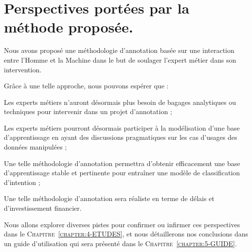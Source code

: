 \section{Perspectives portées par la méthode proposée.}
\label{section:3.3-PERSPECTIVES-METHODE}

	Nous avons proposé une méthodologie d'annotation basée sur une interaction entre l'Homme et la Machine dans le but de soulager l'expert métier dans son intervention.
	
	Grâce à une telle approche, nous pouvons espérer que :
	\begin{todolist}
		\item Les experts métiers n'auront désormais plus besoin de bagages analytiques ou techniques pour intervenir dans un projet d'annotation ;
		\item Les experts métiers pourront désormais participer à la modélisation d'une base d'apprentissage en ayant des discussions pragmatiques sur les cas d'usages des données manipulées ;
		\item Une telle méthodologie d'annotation permettra d'obtenir efficacement une base d'apprentissage stable et pertinente pour entraîner une modèle de classification d'intention ;
		\item Une telle méthodologie d'annotation sera réaliste en terme de délais et d'investissement financier.
	\end{todolist}
	
	Nous allons explorer diverses pistes pour confirmer ou infirmer ces perspectives dans le \textsc{Chapitre~\ref{chapter:4-ETUDES}}, et nous détaillerons nos conclusions dans un guide d'utilisation qui sera présenté dans le \textsc{Chapitre~\ref{chapter:5-GUIDE}}.
